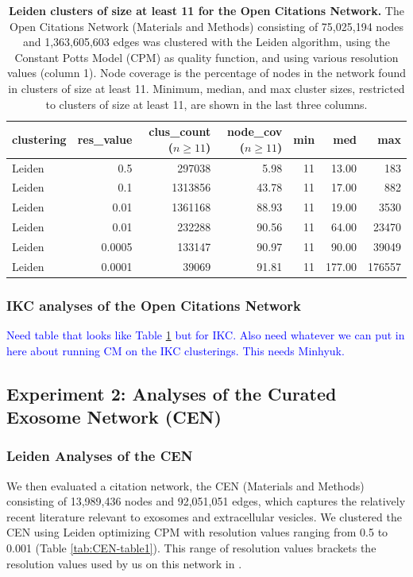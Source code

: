 \documentclass[11pt]{article}   	%
\begin{document}
\begin{table}[H]
\centering
\begin{tabular}{lrrrrrr}
  \hline
 clustering & res\_value & clus\_count ($n \geq 11$) & node\_cov ($n \geq 11$) & min & med & max \\
  \hline
Leiden & 0.5 & 297038 & 5.98 &  11 & 13.00 & 183 \\
Leiden & 0.1 & 1313856 & 43.78 &  11 & 17.00 & 882 \\
Leiden & 0.01 & 1361168 & 88.93 &  11 & 19.00 & 3530 \\
Leiden & 0.01 & 232288 & 90.56 &  11 & 64.00 & 23470 \\
Leiden & 0.0005 & 133147 & 90.97 &  11 & 90.00 & 39049 \\
Leiden & 0.0001 & 39069 & 91.81 &  11 & 177.00 & 176557 \\
   \hline
\end{tabular}
\caption{\textbf{Leiden clusters of size at least 11 for the Open Citations Network.} The Open Citations Network (Materials and Methods) consisting of 75,025,194 nodes and 1,363,605,603 edges was clustered with the Leiden algorithm, using the Constant Potts Model (CPM) as quality function, and using various resolution values (column 1). 
Node coverage is the percentage of nodes in the network found in clusters of size at least 11. Minimum, median, and max cluster sizes, restricted to clusters of size at least 11, are shown in the last three columns.  }
\label{tab:Leiden-11-OC-basicstats}
\end{table}

\subsubsection{IKC analyses of the Open Citations Network}

\textcolor{blue}{Need table that looks like Table \ref{tab:Leiden-11-OC-basicstats} but for IKC. Also need whatever we can put in here about running CM on the IKC clusterings. This needs Minhyuk.}
\subsection{Experiment 2: Analyses of the Curated Exosome Network (CEN)}

\subsubsection{Leiden Analyses of the CEN}

We then evaluated a citation network, the CEN (Materials and Methods) consisting of 13,989,436 nodes and 92,051,051 edges, which captures the relatively recent literature relevant to exosomes and extracellular vesicles. We clustered the CEN using Leiden optimizing CPM with resolution values ranging from 0.5 to 0.001 (Table \ref{tab:CEN-table1}). This range of resolution values brackets the resolution values used by us on this network in   \cite{Jakatdar_2022}.
\end{document}
